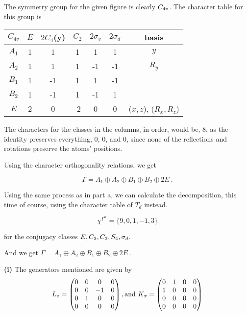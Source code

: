 \begin{alphaparts}

    \questionpart 
    The symmetry group for the given figure is clearly $C_{4v}$. The
    character table for this group is

    \begin{center}
        \begin{tabular}{c|c c c c c c}
            $C_{4v}$ & $E$ & $2C_4$(y) & $C_2$ & $2\sigma_v$ & $2\sigma_d$ & basis \\
            \hline
            $A_1$ & 1 & 1 & 1 & 1 & 1 & $y$ \\
            $A_2$ & 1 & 1 & 1 & -1 & -1 & $R_y$ \\
            $B_1$ & 1 & -1 & 1 & 1 & -1 & \\
            $B_2$ & 1 & -1 & 1 & -1 & 1 & \\
            $E$ & 2 & 0 & -2 & 0 & 0 & ($x, z$), ($R_x, R_z$)\\
        \end{tabular}
    \end{center}

    The characters for the classes in the columns, in order, would be, 8, as the
    identity preserves everything, 0, 0, and 0, since none of the reflections
    and rotations preserve the atoms' positions.

    Using the character orthogonality relations, we get 

    \begin{equation}
        \Gamma = A_1 \oplus A_2 \oplus B_1 \oplus B_2 \oplus 2E~.
    \end{equation}


    \questionpart 
    Using the same process as in part a, we can calculate the decomposition, this
    time of course, using the character table of $T_d$ instead.

    \[\chi^{\Gamma^\alpha} = \{9, 0, 1, -1, 3\}\]

    for the conjugacy classes $E, C_3, C_2, S_4, \sigma_d$.

    And we get $\Gamma = A_1 \oplus A_2 \oplus B_1 \oplus B_2 \oplus 2E~.$

    \questionpart \textbf{(i)}
    The generators mentioned are given by
    \[L_z = \begin{pmatrix}
        0 & 0 & 0 & 0 \\
        0 & 0 &-1 & 0 \\
        0 & 1 & 0 & 0 \\
        0 & 0 & 0 & 0
    \end{pmatrix}, \textnormal{and }
    K_x = \begin{pmatrix}
        0 & 1 & 0 & 0 \\
        1 & 0 & 0 & 0 \\
        0 & 0 & 0 & 0 \\
        0 & 0 & 0 & 0
    \end{pmatrix} \]


\end{alphaparts}
